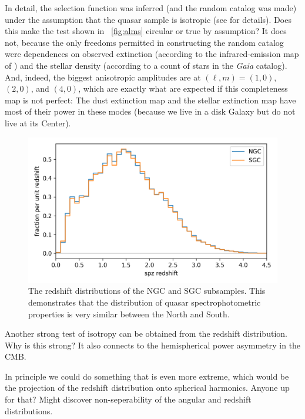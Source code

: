 \documentclass[modern]{aastex631}
\newlength{\figurewidth}
\newcommand{\figref}[1]{\figurename~\ref{#1}}
\begin{document}
In detail, the selection function was inferred (and the random catalog was made) under the assumption that the quasar sample is isotropic (see \citealt{ksf} for details).
Does this make the test shown in \figref{fig:alms} circular or true by assumption?
It does not, because the only freedoms permitted in constructing the random catalog were dependences on observed extinction (according to the infrared-emission map of \citealt{sfd}) and the stellar density (according to a count of stars in the \textsl{Gaia} catalog).
And, indeed, the biggest anisotropic amplitudes are at $(\ell,m)=(1,0)$, $(2,0)$, and $(4,0)$, which are exactly what are expected if this completeness map is not perfect:
The dust extinction map and the stellar extinction map have most of their power in these modes (because we live in a disk Galaxy but do not live at its Center).

\begin{figure}[t!]
  \begin{mdframed}
  \color{captiongray}
  \begin{center}
    \includegraphics[width=\figurewidth]{notebooks/zhist.png}
  \end{center}
    \caption{The redshift distributions of the NGC and SGC subsamples. This demonstrates that the distribution of quasar spectrophotometric properties is very similar between the North and South.\label{fig:zhist}}
  \end{mdframed}
\end{figure}
Another strong test of isotropy can be obtained from the redshift distribution.
Why is this strong?
It also connects to the hemispherical power asymmetry in the CMB.

In principle we could do something that is even more extreme, which would be the projection of the redshift distribution onto spherical harmonics. Anyone up for that? Might discover non-seperability of the angular and redshift distributions.
\end{document}
